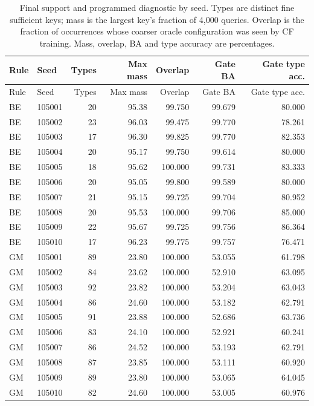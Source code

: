 \begin{longtable}{llrrrrr}
\caption{Final support and programmed diagnostic by seed. Types are distinct
fine sufficient keys; mass is the largest key's fraction of 4,000 queries.
Overlap is the fraction of occurrences whose coarser oracle configuration was
seen by CF training. Mass, overlap, BA and type accuracy are percentages.}\\
\toprule Rule & Seed & Types & Max mass & Overlap & Gate BA & Gate type acc. \\
\midrule\endfirsthead
\toprule Rule & Seed & Types & Max mass & Overlap & Gate BA & Gate type acc. \\
\midrule\endhead
BE & 105001 & 20 & 95.38 & 99.750 & 99.679 & 80.000 \\
BE & 105002 & 23 & 96.03 & 99.475 & 99.770 & 78.261 \\
BE & 105003 & 17 & 96.30 & 99.825 & 99.770 & 82.353 \\
BE & 105004 & 20 & 95.17 & 99.750 & 99.614 & 80.000 \\
BE & 105005 & 18 & 95.62 & 100.000 & 99.731 & 83.333 \\
BE & 105006 & 20 & 95.05 & 99.800 & 99.589 & 80.000 \\
BE & 105007 & 21 & 95.15 & 99.725 & 99.704 & 80.952 \\
BE & 105008 & 20 & 95.53 & 100.000 & 99.706 & 85.000 \\
BE & 105009 & 22 & 95.67 & 99.725 & 99.756 & 86.364 \\
BE & 105010 & 17 & 96.23 & 99.775 & 99.757 & 76.471 \\
GM & 105001 & 89 & 23.80 & 100.000 & 53.055 & 61.798 \\
GM & 105002 & 84 & 23.62 & 100.000 & 52.910 & 63.095 \\
GM & 105003 & 92 & 23.82 & 100.000 & 53.204 & 63.043 \\
GM & 105004 & 86 & 24.60 & 100.000 & 53.182 & 62.791 \\
GM & 105005 & 91 & 23.88 & 100.000 & 52.686 & 63.736 \\
GM & 105006 & 83 & 24.10 & 100.000 & 52.921 & 60.241 \\
GM & 105007 & 86 & 24.52 & 100.000 & 53.193 & 62.791 \\
GM & 105008 & 87 & 23.85 & 100.000 & 53.111 & 60.920 \\
GM & 105009 & 89 & 23.80 & 100.000 & 53.065 & 64.045 \\
GM & 105010 & 82 & 24.60 & 100.000 & 53.005 & 60.976 \\
\bottomrule
\end{longtable}


